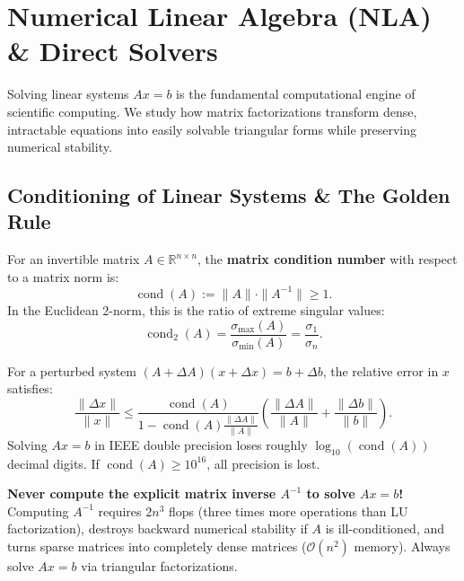 \section{Numerical Linear Algebra (NLA) \& Direct Solvers}

Solving linear systems $A x = b$ is the fundamental computational engine of scientific computing. We study how matrix factorizations transform dense, intractable equations into easily solvable triangular forms while preserving numerical stability.

\subsection{Conditioning of Linear Systems \& The Golden Rule}

\begin{definition}
    For an invertible matrix $A \in \mathbb{R}^{n \times n}$, the \textbf{matrix condition number} with respect to a matrix norm is:
    \begin{equation}
        \operatorname{cond}(A) := \|A\| \cdot \|A^{-1}\| \ge 1.
    \end{equation}
    In the Euclidean 2-norm, this is the ratio of extreme singular values:
    \begin{equation}
        \operatorname{cond}_2(A) = \frac{\sigma_{\max}(A)}{\sigma_{\min}(A)} = \frac{\sigma_1}{\sigma_n}.
    \end{equation}
\end{definition}

For a perturbed system $(A + \Delta A)(x + \Delta x) = b + \Delta b$, the relative error in $x$ satisfies:
\begin{equation}
    \frac{\|\Delta x\|}{\|x\|} \le \frac{\operatorname{cond}(A)}{1 - \operatorname{cond}(A) \frac{\|\Delta A\|}{\|A\|}} \left( \frac{\|\Delta A\|}{\|A\|} + \frac{\|\Delta b\|}{\|b\|} \right).
\end{equation}
Solving $Ax = b$ in IEEE double precision loses roughly $\log_{10}(\operatorname{cond}(A))$ decimal digits. If $\operatorname{cond}(A) \ge 10^{16}$, all precision is lost.

\begin{important}
    \textbf{Never compute the explicit matrix inverse $A^{-1}$ to solve $Ax = b$!} Computing $A^{-1}$ requires $2n^3$ flops (three times more operations than LU factorization), destroys backward numerical stability if $A$ is ill-conditioned, and turns sparse matrices into completely dense matrices ($\mathcal{O}(n^2)$ memory). Always solve $Ax = b$ via triangular factorizations.
\end{important}

